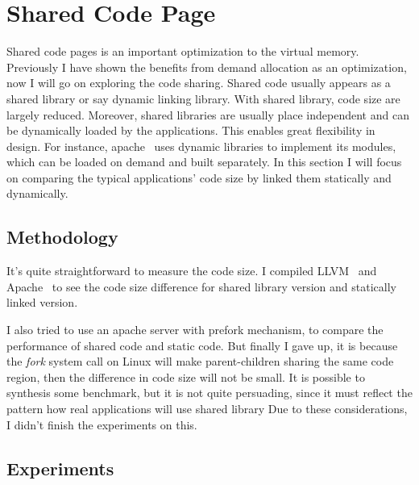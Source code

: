 \section{Shared Code Page}
	\label{sec:sharedobj}
Shared code pages is an important optimization to the virtual memory.
Previously I have shown the benefits from demand allocation as an optimization,
now I will go on exploring the code sharing. Shared code usually appears as a
shared library or say dynamic linking library. With shared library, code size
are largely reduced. Moreover, shared libraries are usually place independent
and can be dynamically loaded by the applications. This enables great
flexibility in design. For instance, apache~\cite{apache} uses dynamic
libraries to implement its modules, which can be loaded on demand and built
separately. In this section I will focus on comparing the typical applications'
code size by linked them statically and dynamically.

\subsection{Methodology}
It's quite straightforward to measure the code size. I compiled
LLVM~\cite{llvm} and Apache~\cite{apache} to see the code size difference for
shared library version and statically linked version.

I also tried to use an apache server with prefork mechanism, to compare the
performance of shared code and static code. But finally I gave up, it is
because the \emph{fork} system call on Linux will make parent-children sharing
the same code region, then the difference in code size will not be small. It is
possible to synthesis some benchmark, but it is not quite persuading, since it 
must reflect the pattern how real applications will use shared library Due to
these considerations, I didn't finish the experiments on this. 

\subsection{Experiments}

